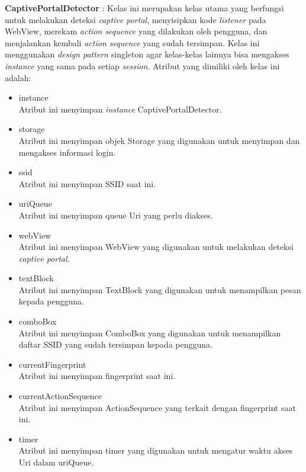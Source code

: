 \documentclass[a4paper,twoside]{article}
\begin{document}
\begin{enumerate}
\begin{itemize}
{                \textbf{CaptivePortalDetector} : Kelas ini merupakan kelas utama yang berfungsi untuk melakukan deteksi \textit{captive portal}, menyisipkan kode \textit{listener} pada WebView, merekam \textit{action sequence} yang dilakukan oleh pengguna, dan menjalankan kembali \textit{action sequence} yang sudah tersimpan. Kelas ini menggunakan \textit{design pattern} singleton agar kelas-kelas lainnya bisa mengakses \textit{instance} yang sama pada setiap \textit{session}. Atribut yang dimiliki oleh kelas ini adalah:
                \begin{itemize}
                    \item{instance\\Atribut ini menyimpan \textit{instance} CaptivePortalDetector.}
                    \item{storage\\Atribut ini menyimpan objek Storage yang digunakan untuk menyimpan dan mengakses informasi login.}
                    \item{ssid\\Atribut ini menyimpan SSID saat ini.}
                    \item{uriQueue\\Atribut ini menyimpan queue Uri yang perlu diakses.}
                    \item{webView\\Atribut ini menyimpan WebView yang digunakan untuk melakukan deteksi \textit{captive portal}.}
                    \item{textBlock\\Atribut ini menyimpan TextBlock yang digunakan untuk menampilkan pesan kepada pengguna.}
                    \item{comboBox\\Atribut ini menyimpan ComboBox yang digunakan untuk menampilkan daftar SSID yang sudah tersimpan kepada pengguna.}
                    \item{currentFingerprint\\Atribut ini menyimpan fingerprint saat ini.}
                    \item{currentActionSequence\\Atribut ini menyimpan ActionSequence yang terkait dengan fingerprint saat ini.}
                    \item{timer\\Atribut ini menyimpan timer yang digunakan untuk mengatur waktu akses Uri dalam uriQueue.}
                \end{itemize}
}
\end{itemize}
\end{enumerate}
\end{document}
